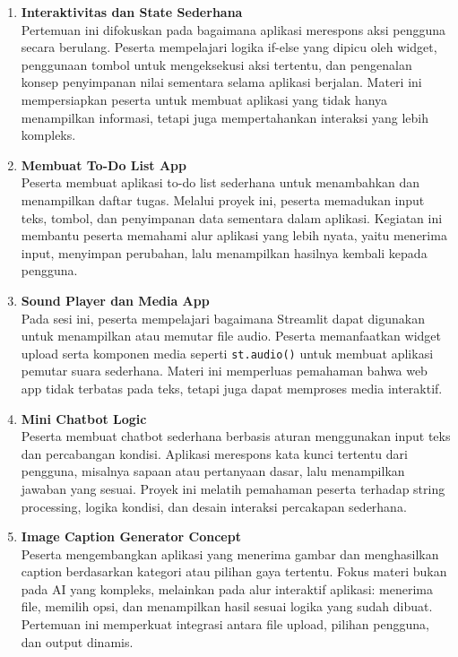 \documentclass[11pt,a4paper]{article}
\begin{document}
\begin{enumerate}[leftmargin=1.6em, label=\arabic*.]
\item \textbf{Interaktivitas dan State Sederhana}\\
Pertemuan ini difokuskan pada bagaimana aplikasi merespons aksi pengguna secara berulang. Peserta mempelajari logika if-else yang dipicu oleh widget, penggunaan tombol untuk mengeksekusi aksi tertentu, dan pengenalan konsep penyimpanan nilai sementara selama aplikasi berjalan. Materi ini mempersiapkan peserta untuk membuat aplikasi yang tidak hanya menampilkan informasi, tetapi juga mempertahankan interaksi yang lebih kompleks.

\item \textbf{Membuat To-Do List App}\\
Peserta membuat aplikasi to-do list sederhana untuk menambahkan dan menampilkan daftar tugas. Melalui proyek ini, peserta memadukan input teks, tombol, dan penyimpanan data sementara dalam aplikasi. Kegiatan ini membantu peserta memahami alur aplikasi yang lebih nyata, yaitu menerima input, menyimpan perubahan, lalu menampilkan hasilnya kembali kepada pengguna.

\item \textbf{Sound Player dan Media App}\\
Pada sesi ini, peserta mempelajari bagaimana Streamlit dapat digunakan untuk menampilkan atau memutar file audio. Peserta memanfaatkan widget upload serta komponen media seperti \texttt{st.audio()} untuk membuat aplikasi pemutar suara sederhana. Materi ini memperluas pemahaman bahwa web app tidak terbatas pada teks, tetapi juga dapat memproses media interaktif.

\item \textbf{Mini Chatbot Logic}\\
Peserta membuat chatbot sederhana berbasis aturan menggunakan input teks dan percabangan kondisi. Aplikasi merespons kata kunci tertentu dari pengguna, misalnya sapaan atau pertanyaan dasar, lalu menampilkan jawaban yang sesuai. Proyek ini melatih pemahaman peserta terhadap string processing, logika kondisi, dan desain interaksi percakapan sederhana.

\item \textbf{Image Caption Generator Concept}\\
Peserta mengembangkan aplikasi yang menerima gambar dan menghasilkan caption berdasarkan kategori atau pilihan gaya tertentu. Fokus materi bukan pada AI yang kompleks, melainkan pada alur interaktif aplikasi: menerima file, memilih opsi, dan menampilkan hasil sesuai logika yang sudah dibuat. Pertemuan ini memperkuat integrasi antara file upload, pilihan pengguna, dan output dinamis.


\end{enumerate}
\end{document}
